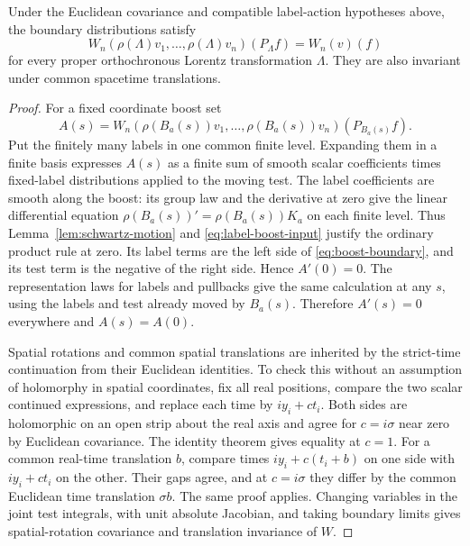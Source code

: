 \begin{theorem}\label{thm:lorentz-covariance}
Under the Euclidean covariance and compatible label-action hypotheses above,
the boundary distributions satisfy
\[
 W_n(\rho(\Lambda)v_1,\ldots,\rho(\Lambda)v_n)(P_\Lambda f)
          =W_n(v)(f)
\]
for every proper orthochronous Lorentz transformation $\Lambda$.
They are also invariant under common spacetime translations.
\end{theorem}
\begin{proof}
For a fixed coordinate boost set
\[
 A(s)=W_n(\rho(B_a(s))v_1,\ldots,\rho(B_a(s))v_n)
                                           (P_{B_a(s)}f).
\]
Put the finitely many labels in one common finite level. Expanding them in
a finite basis expresses $A(s)$ as a finite sum of smooth scalar
coefficients times fixed-label distributions applied to the moving test.
The label coefficients are smooth along the boost: its group law and
the derivative at zero give the linear differential equation
$\rho(B_a(s))' = \rho(B_a(s))K_a$ on each finite level.
Thus Lemma~\ref{lem:schwartz-motion} and
\eqref{eq:label-boost-input} justify the ordinary product rule at zero.
Its label terms are the left side of \eqref{eq:boost-boundary}, and its
test term is the negative of the right side. Hence $A'(0)=0$.
The representation laws for labels and pullbacks give the same calculation
at any $s$, using the labels and test already moved by $B_a(s)$.
Therefore $A'(s)=0$ everywhere and $A(s)=A(0)$.

Spatial rotations and common spatial translations are inherited by the
strict-time continuation from their Euclidean identities. To check this
without an assumption of holomorphy in spatial coordinates, fix all real
positions, compare the two scalar continued expressions, and replace each
time by $iy_i+ct_i$. Both sides are holomorphic on an open strip about the
real axis and agree for $c=i\sigma$ near zero by Euclidean covariance.
The identity theorem gives equality at $c=1$.
For a common real-time translation $b$, compare times
$iy_i+c(t_i+b)$ on one side with $iy_i+ct_i$ on the other. Their gaps
agree, and at $c=i\sigma$ they differ by the common Euclidean time
translation $\sigma b$. The same proof applies. Changing variables in the
joint test integrals, with unit absolute Jacobian, and taking boundary
limits gives spatial-rotation covariance and translation invariance of $W$.


\end{proof}
